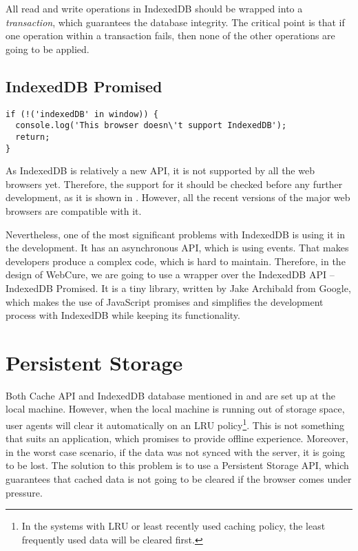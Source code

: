 All read and write operations in IndexedDB should be wrapped into a \textit{transaction}, which guarantees the database integrity. The critical point is that if one operation within a transaction fails, then none of the other operations are going to be applied. 

\subsection{IndexedDB Promised}

\begin{lstlisting}[caption={[Code for checking the support of IndexedDB API]Code, which demonstrates how one can check the support for IndexedDB API\cite{35}.}, label={lst:tech7}]
if (!('indexedDB' in window)) {
  console.log('This browser doesn\'t support IndexedDB');
  return;
}
\end{lstlisting}

As IndexedDB is relatively a new API, it is not supported by all the web browsers yet. Therefore, the support for it should be checked before any further development, as it is shown in . However, all the recent versions of the major web browsers are compatible with it. 

Nevertheless, one of the most significant problems with IndexedDB is using it in the development. It has an asynchronous API, which is using events. That makes developers produce a complex code, which is hard to maintain. Therefore, in the design of WebCure, we are going to use a wrapper over the IndexedDB API -- IndexedDB Promised\cite{36, 48}. It is a tiny library, written by Jake Archibald from Google, which makes the use of JavaScript promises and simplifies the development process with IndexedDB while keeping its functionality.

\section{Persistent Storage}
\label{persistentstorage}

Both Cache API and IndexedDB database mentioned in  and  are set up at the local machine. However, when the local machine is running out of storage space, user agents will clear it automatically on an LRU policy\footnote{In the systems with LRU or least recently used caching policy, the least frequently used data will be cleared first.}\cite{47}. This is not something that suits an application, which promises to provide offline experience. Moreover, in the worst case scenario, if the data was not synced with the server, it is going to be lost. The solution to this problem is to use a Persistent Storage API\cite{45, 46}, which guarantees that cached data is not going to be cleared if the browser comes under pressure.

